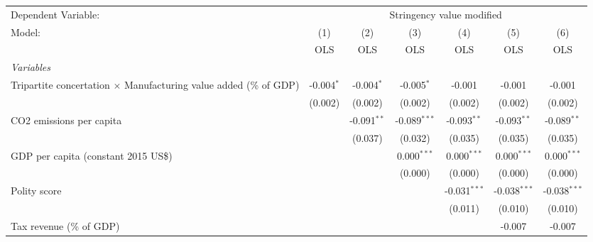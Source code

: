 
\begingroup
\centering
\begin{tabular}{lcccccc}
   \toprule
   Dependent Variable: & \multicolumn{6}{c}{Stringency value modified}\\
   Model:                                                                   & (1)          & (2)           & (3)            & (4)            & (5)            & (6)\\  
                                                                            &  OLS         & OLS           & OLS            & OLS            & OLS            & OLS\\  
   \midrule
   \emph{Variables}\\
   Tripartite concertation $\times$ Manufacturing value added (\% of GDP)   & -0.004$^{*}$ & -0.004$^{*}$  & -0.005$^{*}$   & -0.001         & -0.001         & -0.001\\   
                                                                            & (0.002)      & (0.002)       & (0.002)        & (0.002)        & (0.002)        & (0.002)\\   
   CO2 emissions per capita                                                 &              & -0.091$^{**}$ & -0.089$^{***}$ & -0.093$^{**}$  & -0.093$^{**}$  & -0.089$^{**}$\\   
                                                                            &              & (0.037)       & (0.032)        & (0.035)        & (0.035)        & (0.035)\\   
   GDP per capita (constant 2015 US\$)                                      &              &               & 0.000$^{***}$  & 0.000$^{***}$  & 0.000$^{***}$  & 0.000$^{***}$\\   
                                                                            &              &               & (0.000)        & (0.000)        & (0.000)        & (0.000)\\   
   Polity score                                                             &              &               &                & -0.031$^{***}$ & -0.038$^{***}$ & -0.038$^{***}$\\   
                                                                            &              &               &                & (0.011)        & (0.010)        & (0.010)\\   
   Tax revenue (\% of GDP)                                                  &              &               &                &                & -0.007         & -0.007\\   

\end{tabular}
